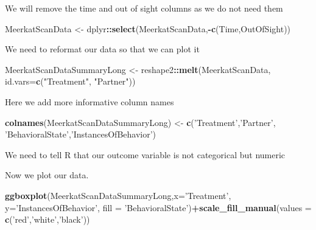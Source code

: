 \documentclass[]{book}
\newenvironment{Shaded}{\begin{snugshade}}{\end{snugshade}}
\newcommand{\DataTypeTok}[1]{\textcolor[rgb]{0.13,0.29,0.53}{#1}}
\newcommand{\KeywordTok}[1]{\textcolor[rgb]{0.13,0.29,0.53}{\textbf{#1}}}
\newcommand{\NormalTok}[1]{#1}
\newcommand{\OperatorTok}[1]{\textcolor[rgb]{0.81,0.36,0.00}{\textbf{#1}}}
\newcommand{\StringTok}[1]{\textcolor[rgb]{0.31,0.60,0.02}{#1}}
\begin{document}
We will remove the time and out of sight columns as we do not need them

\begin{Shaded}
\begin{Highlighting}[]
\NormalTok{MeerkatScanData <-}\StringTok{ }\NormalTok{dplyr}\OperatorTok{::}\KeywordTok{select}\NormalTok{(MeerkatScanData,}\OperatorTok{-}\KeywordTok{c}\NormalTok{(Time,OutOfSight))}
\end{Highlighting}
\end{Shaded}

We need to reformat our data so that we can plot it

\begin{Shaded}
\begin{Highlighting}[]
\NormalTok{MeerkatScanDataSummaryLong <-}\StringTok{ }\NormalTok{reshape2}\OperatorTok{::}\KeywordTok{melt}\NormalTok{(MeerkatScanData, }\DataTypeTok{id.vars=}\KeywordTok{c}\NormalTok{(}\StringTok{"Treatment"}\NormalTok{, }\StringTok{"Partner"}\NormalTok{))}
\end{Highlighting}
\end{Shaded}

Here we add more informative column names

\begin{Shaded}
\begin{Highlighting}[]
\KeywordTok{colnames}\NormalTok{(MeerkatScanDataSummaryLong) <-}\StringTok{ }\KeywordTok{c}\NormalTok{(}\StringTok{'Treatment'}\NormalTok{,}\StringTok{'Partner'}\NormalTok{,}
                                          \StringTok{'BehavioralState'}\NormalTok{,}\StringTok{'InstancesOfBehavior'}\NormalTok{)}
\end{Highlighting}
\end{Shaded}

We need to tell R that our outcome variable is not categorical but numeric

\begin{Shaded}
\end{Shaded}

Now we plot our data.

\begin{Shaded}
\begin{Highlighting}[]
\KeywordTok{ggboxplot}\NormalTok{(MeerkatScanDataSummaryLong,}\DataTypeTok{x=}\StringTok{'Treatment'}\NormalTok{,}
          \DataTypeTok{y=}\StringTok{'InstancesOfBehavior'}\NormalTok{, }\DataTypeTok{fill =} \StringTok{'BehavioralState'}\NormalTok{)}\OperatorTok{+}\KeywordTok{scale_fill_manual}\NormalTok{(}\DataTypeTok{values =} \KeywordTok{c}\NormalTok{(}\StringTok{'red'}\NormalTok{,}\StringTok{'white'}\NormalTok{,}\StringTok{'black'}\NormalTok{))}
\end{Highlighting}
\end{Shaded}
\end{document}
